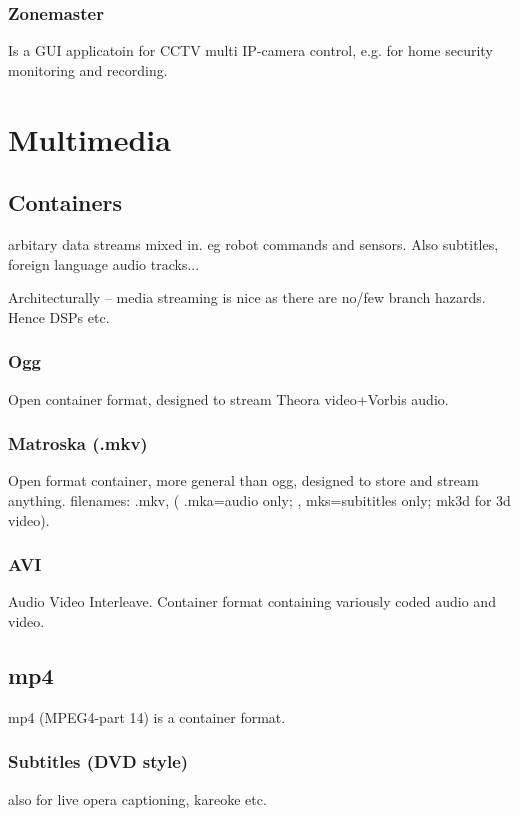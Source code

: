 \documentclass[oneside,english]{scrbook}
\begin{document}
\section{Zonemaster}
Is a GUI applicatoin for CCTV multi IP-camera control, e.g. for home security monitoring and recording.




\part{Multimedia}


\chapter{Containers}

arbitary data streams mixed in. eg robot commands and sensors. Also
subtitles, foreign language audio tracks...

Architecturally -- media streaming is nice as there are no/few branch hazards. Hence DSPs etc.

\section{Ogg}
Open container format, designed to stream Theora video+Vorbis audio.

\section{Matroska (.mkv)}
Open format container, more general than ogg, designed to store and stream anything.
filenames: .mkv,  ( .mka=audio only; , mks=subititles only; mk3d for 3d video).

\section{AVI}
Audio Video Interleave. Container format containing variously coded audio and video.

\chapter{mp4}
mp4 (MPEG4-part 14) is a container format.

\section{Subtitles (DVD style)}
also for live opera captioning, kareoke etc.
\end{document}

